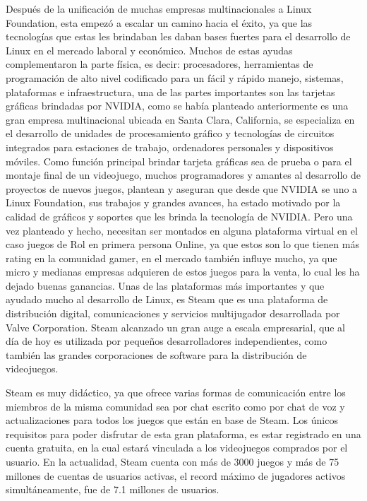 Después de la unificación de muchas empresas multinacionales
a Linux Foundation, esta empezó a escalar un camino hacia el
éxito, ya que las tecnologías que estas les brindaban les daban
bases fuertes para el desarrollo de Linux en el mercado laboral y
económico. Muchos de estas ayudas complementaron la parte
física, es decir: procesadores, herramientas de programación de
alto nivel codificado para un fácil y rápido manejo, sistemas,
plataformas e infraestructura, una de las partes importantes son
las tarjetas gráficas brindadas por NVIDIA, como se había
planteado anteriormente es una gran empresa multinacional
ubicada en Santa Clara, California, se especializa en el
desarrollo de unidades de procesamiento gráfico y tecnologías
de circuitos integrados para estaciones de trabajo, ordenadores
personales y dispositivos móviles. Como función principal
brindar tarjeta gráficas sea de prueba o para el montaje final de
un videojuego, muchos programadores y amantes al desarrollo
de proyectos de nuevos juegos, plantean y aseguran que desde
que NVIDIA se uno a Linux Foundation, sus trabajos y grandes
avances, ha estado motivado por la calidad de gráficos y
soportes que les brinda la tecnología de NVIDIA. Pero una vez
planteado y hecho, necesitan ser montados en alguna plataforma
virtual en el caso juegos de Rol en primera persona Online, ya
que estos son lo que tienen más rating en la comunidad gamer,
en el mercado también influye mucho, ya que micro y medianas
empresas adquieren de estos juegos para la venta, lo cual les ha
dejado buenas ganancias. Unas de las plataformas más
importantes y que ayudado mucho al desarrollo de Linux, es
Steam que es una plataforma de distribución digital,
comunicaciones y servicios multijugador desarrollada por Valve
Corporation. Steam alcanzado un gran auge a escala
empresarial, que al día de hoy es utilizada por pequeños
desarrolladores independientes, como también las grandes
corporaciones de software para la distribución de videojuegos.

Steam es muy didáctico, ya que ofrece varias formas de
comunicación entre los miembros de la misma comunidad sea
por chat escrito como por chat de voz y actualizaciones para
todos los juegos que están en base de Steam. Los únicos
requisitos para poder disfrutar de esta gran plataforma, es estar
registrado en una cuenta gratuita, en la cual estará vinculada a
los videojuegos comprados por el usuario. En la actualidad,
Steam cuenta con más de 3000 juegos y más de 75 millones de
cuentas de usuarios activas, el record máximo de jugadores
activos simultáneamente, fue de 7.1 millones de usuarios.

